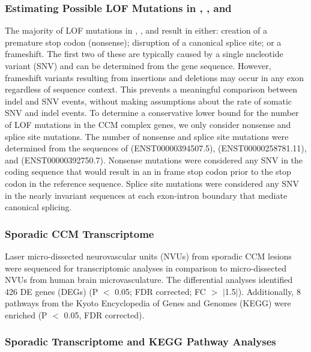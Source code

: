 \subsubsection{Estimating Possible LOF Mutations in , , and }
The majority of LOF mutations in , , and  result in either: creation of a premature stop codon (nonsense); disruption of a canonical splice site; or a frameshift. The first two of these are typically caused by a single nucleotide variant (SNV) and can be determined from the gene sequence. However, frameshift variants resulting from insertions and deletions may occur in any exon regardless of sequence context. This prevents a meaningful comparison between indel and SNV events, without making assumptions about the rate of somatic SNV and indel events. To determine a conservative lower bound for the number of LOF mutations in the CCM complex genes, we only consider nonsense and splice site mutations. The number of nonsense and splice site mutations were determined from the sequences of  (ENST00000394507.5),  (ENST00000258781.11), and  (ENST00000392750.7). Nonsense mutations were considered any SNV in the coding sequence that would result in an in frame stop codon prior to the stop codon in the reference sequence. Splice site mutations were considered any SNV in the nearly invariant sequences at each exon-intron boundary that mediate canonical splicing. 
	
\subsubsection{Sporadic CCM Transcriptome}
Laser micro-dissected neurovascular units (NVUs) from sporadic CCM lesions were sequenced for transcriptomic analyses in comparison to micro-dissected NVUs from human brain microvasculature. The differential analyses identified 426 DE genes (DEGs) (P $<$ 0.05; FDR corrected; FC $>$ $\vert$1.5$\vert$). Additionally, 8 pathways from the Kyoto Encyclopedia of Genes and Genomes (KEGG) were enriched (P $<$ 0.05, FDR corrected).  


\subsubsection{Sporadic Transcriptome and KEGG Pathway Analyses}

